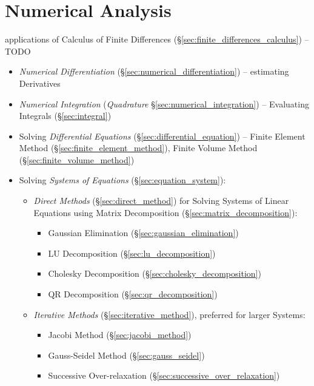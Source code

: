 \section{Numerical Analysis}\label{sec:numerical_analysis}

applications of Calculus of Finite Differences
(\S\ref{sec:finite_differences_calculus}) --TODO

\begin{itemize}
  \item \emph{Numerical Differentiation} (\S\ref{sec:numerical_differentiation})
    -- estimating Derivatives
  \item \emph{Numerical Integration} (\emph{Quadrature}
    \S\ref{sec:numerical_integration}) -- Evaluating Integrals
    (\S\ref{sec:integral})
  \item Solving \emph{Differential Equations}
    (\S\ref{sec:differential_equation}) -- Finite Element Method
    (\S\ref{sec:finite_element_method}), Finite Volume Method
    (\S\ref{sec:finite_volume_method})
  \item Solving \emph{Systems of Equations} (\S\ref{sec:equation_system}):
    \begin{itemize}
      \item \emph{Direct Methods} (\S\ref{sec:direct_method}) for Solving
        Systems of Linear Equations using Matrix Decomposition
        (\S\ref{sec:matrix_decomposition}):
        \begin{itemize}
          \item Gaussian Elimination (\S\ref{sec:gaussian_elimination})
          \item LU Decomposition (\S\ref{sec:lu_decomposition})
          \item Cholesky Decomposition (\S\ref{sec:cholesky_decomposition})
          \item QR Decomposition (\S\ref{sec:qr_decomposition})
        \end{itemize}
      \item \emph{Iterative Methods} (\S\ref{sec:iterative_method}), preferred
        for larger Systems:
        \begin{itemize}
          \item Jacobi Method (\S\ref{sec:jacobi_method})
          \item Gauss-Seidel Method (\S\ref{sec:gauss_seidel})
          \item Successive Over-relaxation
            (\S\ref{sec:successive_over_relaxation})

\end{itemize}
\end{itemize}
\end{itemize}
